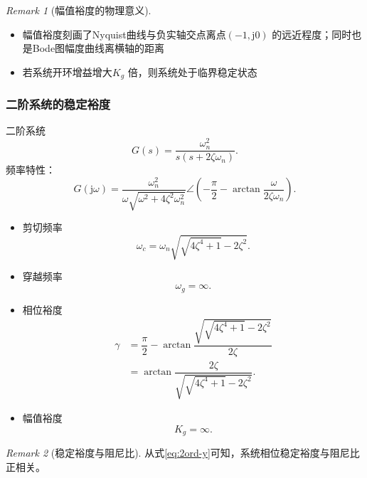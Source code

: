 \documentclass[14pt,a4paper]{article}
\theoremstyle{plain}
\theoremstyle{definition}
\theoremstyle{remark}
\newtheorem{rmk}{Remark}[section]
\theoremstyle{plain}
\theoremstyle{plain}
\theoremstyle{plain}
\theoremstyle{definition}
\theoremstyle{remark}
\numberwithin{equation}{section}
\begin{document}
			\begin{rmk}[幅值裕度的物理意义]  
			\label{rmk:幅值裕度的物理意义}
				\ 
				\begin{itemize}
					\item 幅值裕度刻画了Nyquist曲线与负实轴交点离点$(-1,\mathrm{j} 0)$ 的远近程度；同时也是Bode图幅度曲线离横轴的距离
					\item 若系统开环增益增大$K_g$ 倍，则系统处于临界稳定状态
				\end{itemize}
			\end{rmk} 

			\subsubsection{二阶系统的稳定裕度}%
			\label{ssub:二阶系统的稳定裕度}
			
				二阶系统
				\[
					G(s) = \dfrac{\omega_{n}^2}{s\left( s+2\zeta\omega_{n} \right) } 
				.\] 
				频率特性：
				\[
					G(\mathrm{j} \omega) =  \dfrac{\omega_{n}^2}{\omega \sqrt{\omega^2+4\zeta^2\omega_{n}^2} } \angle \left( -\dfrac{\pi}{2} - \arctan \dfrac{\omega}{2\zeta\omega_{n}} \right) 
				.\]
				\begin{itemize}
					\item 剪切频率
						\begin{equation}
						\label{eq:2ord-wc}
							\omega_c = \omega_{n}\sqrt{\sqrt{4\zeta^4+1} -2\zeta^2} 
						.\end{equation} 
					\item 穿越频率
						\begin{equation}
						\label{eq:2ord-wg}
						\omega_g = \infty
						.\end{equation} 
					\item 相位裕度
					\begin{align}
					\label{eq:2ord-y}
						\gamma &= \dfrac{\pi}{2} - \arctan \dfrac{\sqrt{\sqrt{4\zeta^4+1} -2\zeta^2}}{2\zeta} \nonumber \\
							   &= \arctan \dfrac{2\zeta}{\sqrt{\sqrt{4\zeta^4+1} -2\zeta^2}}
					.\end{align} 
					\item 幅值裕度
						\begin{equation}
						\label{eq:2ord-kg}
							K_g = \infty
						.\end{equation} 
				\end{itemize}

			\begin{rmk}[稳定裕度与阻尼比]  
			\label{rmk:稳定裕度与阻尼比}
				从式\eqref{eq:2ord-y}可知，系统相位稳定裕度与阻尼比正相关。
			\end{rmk}
\end{document}
